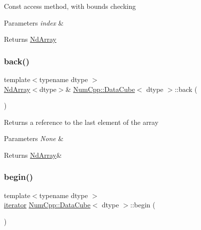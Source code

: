 Const access method, with bounds checking


\begin{DoxyParams}{Parameters}
{\em index} & \\
\hline
\end{DoxyParams}
\begin{DoxyReturn}{Returns}
\mbox{\hyperlink{class_num_cpp_1_1_nd_array}{Nd\+Array}} 
\end{DoxyReturn}
\mbox{\label{class_num_cpp_1_1_data_cube_a856a49c18f35b0527e3aab14fceb6bd9}} 
\subsubsection{\texorpdfstring{back()}{back()}}
{\footnotesize\ttfamily template$<$typename dtype $>$ \\
\mbox{\hyperlink{class_num_cpp_1_1_nd_array}{Nd\+Array}}$<$dtype$>$\& \mbox{\hyperlink{class_num_cpp_1_1_data_cube}{Num\+Cpp\+::\+Data\+Cube}}$<$ dtype $>$\+::back (\begin{DoxyParamCaption}{ }\end{DoxyParamCaption})\hspace{0.3cm}{\ttfamily [inline]}}

Returns a reference to the last element of the array


\begin{DoxyParams}{Parameters}
{\em None} & \\
\hline
\end{DoxyParams}
\begin{DoxyReturn}{Returns}
\mbox{\hyperlink{class_num_cpp_1_1_nd_array}{Nd\+Array}}\& 
\end{DoxyReturn}
\mbox{\label{class_num_cpp_1_1_data_cube_acbce5c780a3d66e6db255e87d2b8b918}} 
\subsubsection{\texorpdfstring{begin()}{begin()}}
{\footnotesize\ttfamily template$<$typename dtype $>$ \\
\mbox{\hyperlink{class_num_cpp_1_1_data_cube_a817f739957d3d426e8a19a66867674ba}{iterator}} \mbox{\hyperlink{class_num_cpp_1_1_data_cube}{Num\+Cpp\+::\+Data\+Cube}}$<$ dtype $>$\+::begin (\begin{DoxyParamCaption}{ }\end{DoxyParamCaption})\hspace{0.3cm}{\ttfamily [inline]}}

